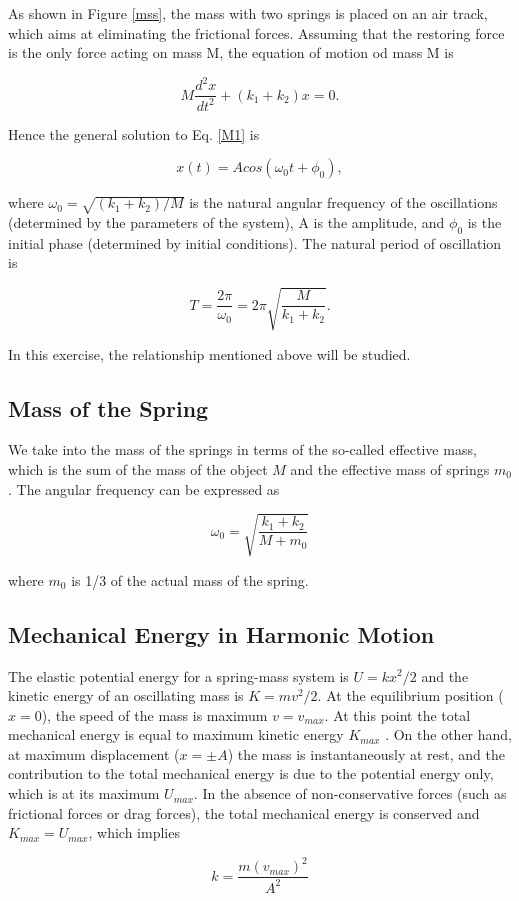 As shown in Figure \ref{mss}, the mass with two springs is placed on an
air track, which aims at eliminating the frictional forces. Assuming that the
restoring force is the only force acting on mass M, the equation of motion od
mass M is 

\begin{equation}
\label{M1}
M\frac{d^2x}{dt^2}+(k_1+k_2)x=0.
\end{equation}

Hence the general solution to Eq. \ref{M1} is

\begin{equation}
x(t)=Acos(\omega_0t+\phi_0),
\end{equation}

where $\omega_0=\sqrt{(k_1+k_2)/M}$ is the natural angular frequency of the
oscillations (determined by the parameters of the system), A is the amplitude,
and $\phi_0$ is the initial phase (determined by initial conditions). The
natural period of oscillation is 

\begin{equation}
T=\frac{2\pi}{\omega_0}=2\pi\sqrt{\frac{M}{k_1+k_2}}.
\end{equation}
    
In this exercise, the relationship mentioned above will be studied.
    
\subsection{Mass of the Spring}

We take into the mass of the springs in terms of the so-called
effective mass, which is the sum of the mass of the object $M$ and
the effective mass of springs $m_0$.
The angular frequency can be expressed as

\begin{equation}
  \label{omega1}
\omega_0=\sqrt{\frac{k_1+k_2}{M+m_0}}
\end{equation}

where $m_0$ is 1/3 of the actual mass of the spring.

\subsection{Mechanical Energy in Harmonic Motion}

The elastic potential energy for a spring-mass system is $U=kx^2/2$ and the
kinetic energy of an oscillating mass is $K=mv^2/2$.
At the equilibrium position ($x=0$), the speed of the mass is maximum
$v=v_{max}$. 
At this point the total mechanical energy is equal to maximum kinetic energy
$K_{max}$ . 
On the other hand, at maximum displacement ($x=\pm A$) the mass is
instantaneously at rest, and the contribution to the total mechanical energy is
due to the potential energy only, which is at its maximum $U_{max}$. 
In the absence of non-conservative forces (such as frictional forces or drag
forces), the total mechanical energy is conserved and $K_{max}=U_{max}$, which
implies  

\begin{equation}
k=\frac{m (v_{max})^2}{A^2}
\end{equation}

